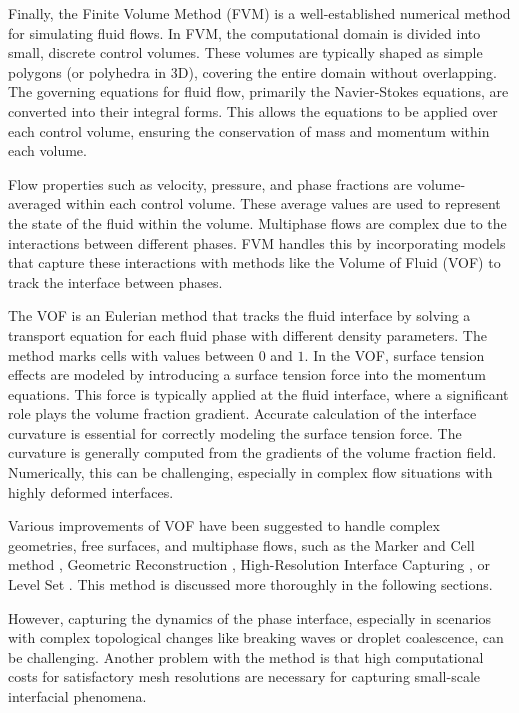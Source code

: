 Finally, the Finite Volume Method (\ac{FVM}) is a well-established numerical method for simulating fluid flows. In FVM, the computational domain is divided into small, discrete control volumes. These volumes are typically shaped as simple polygons (or polyhedra in 3D), covering the entire domain without overlapping. The governing equations for fluid flow, primarily the Navier-Stokes equations, are converted into their integral forms. This allows the equations to be applied over each control volume, ensuring the conservation of mass and momentum within each volume.

Flow properties such as velocity, pressure, and phase fractions are volume-averaged within each control volume. These average values are used to represent the state of the fluid within the volume. Multiphase flows are complex due to the interactions between different phases. FVM handles this by incorporating models that capture these interactions with methods like the Volume of Fluid (VOF) to track the interface between phases. 

The VOF is an Eulerian method that tracks the fluid interface by solving a transport equation for each fluid phase with different density parameters. The method marks cells with values between $0$ and $1$. In the VOF, surface tension effects are modeled by introducing a surface tension force into the momentum equations. This force is typically applied at the fluid interface, where a significant role plays the volume fraction gradient. Accurate calculation of the interface curvature is essential for correctly modeling the surface tension force. The curvature is generally computed from the gradients of the volume fraction field. Numerically, this can be challenging, especially in complex flow situations with highly deformed interfaces.

Various improvements of VOF have been suggested to handle complex geometries, free surfaces, and multiphase flows, such as the Marker and Cell method \cite{mac}, Geometric Reconstruction \cite{VOF_reocnstr}, High-Resolution Interface Capturing \cite{HIRC}, or Level Set \cite{VOF_level_set}. This method is discussed more thoroughly in the following sections. 

However, capturing the dynamics of the phase interface, especially in scenarios with complex topological changes like breaking waves or droplet coalescence, can be challenging. Another problem with the method is that high computational costs for satisfactory mesh resolutions are necessary for capturing small-scale interfacial phenomena. 

